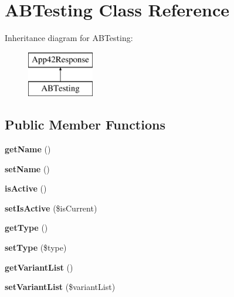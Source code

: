 \hypertarget{class_a_b_testing}{\section{A\+B\+Testing Class Reference}
\label{class_a_b_testing}
}
Inheritance diagram for A\+B\+Testing\+:\begin{figure}[H]
\begin{center}
\leavevmode
\includegraphics[height=2.000000cm]{class_a_b_testing}
\end{center}
\end{figure}
\subsection*{Public Member Functions}
\begin{DoxyCompactItemize}
\item 
\hypertarget{class_a_b_testing_a3d0963e68bb313b163a73f2803c64600}{{\bfseries get\+Name} ()}\label{class_a_b_testing_a3d0963e68bb313b163a73f2803c64600}

\item 
\hypertarget{class_a_b_testing_a13b4707983abe9ff7303271d75c4fd1e}{{\bfseries set\+Name} ()}\label{class_a_b_testing_a13b4707983abe9ff7303271d75c4fd1e}

\item 
\hypertarget{class_a_b_testing_aa56a17bc66c1081fad1cca3a488224c3}{{\bfseries is\+Active} ()}\label{class_a_b_testing_aa56a17bc66c1081fad1cca3a488224c3}

\item 
\hypertarget{class_a_b_testing_ad98e35a2dfa3d5b38dc80c06a925aa3a}{{\bfseries set\+Is\+Active} (\$is\+Current)}\label{class_a_b_testing_ad98e35a2dfa3d5b38dc80c06a925aa3a}

\item 
\hypertarget{class_a_b_testing_a830b5c75df72b32396701bc563fbe3c7}{{\bfseries get\+Type} ()}\label{class_a_b_testing_a830b5c75df72b32396701bc563fbe3c7}

\item 
\hypertarget{class_a_b_testing_ade096bf521b5d05dcaff2ba1a42e9f71}{{\bfseries set\+Type} (\$type)}\label{class_a_b_testing_ade096bf521b5d05dcaff2ba1a42e9f71}

\item 
\hypertarget{class_a_b_testing_aa43db35d28bb2dca04be9ea18dfa60c9}{{\bfseries get\+Variant\+List} ()}\label{class_a_b_testing_aa43db35d28bb2dca04be9ea18dfa60c9}

\item 
\hypertarget{class_a_b_testing_abf7b00756b4e2b7cb26f5a57987e9034}{{\bfseries set\+Variant\+List} (\$variant\+List)}\label{class_a_b_testing_abf7b00756b4e2b7cb26f5a57987e9034}

\end{DoxyCompactItemize}
